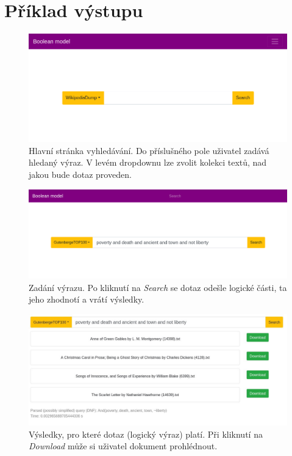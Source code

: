 \documentclass[a4paper,titlepage]{article}
\begin{document}
\section*{Příklad výstupu}

\begin{figure}[h]
\includegraphics[scale=0.4]{Frontend_search_page.png}
\caption{Hlavní stránka vyhledávání. Do příslušného pole uživatel zadává hledaný výraz.
V levém dropdownu lze zvolit kolekci textů, nad jakou bude dotaz proveden.
}
\end{figure}

\begin{figure}[h]
\includegraphics[scale=0.35]{Frontend_search_page_with_query.png}
\caption{Zadání výrazu. Po kliknutí na \emph{Search} se dotaz odešle
logické části, ta jeho zhodnotí a vrátí výsledky.}
\end{figure}

\begin{figure}[h]
\includegraphics[scale=0.35]{Frontend_query_results.jpg}
\caption{Výsledky, pro které dotaz (logický výraz) platí.
Při kliknutí na \emph{Download} může si uživatel dokument prohlédnout.}
\end{figure}
\end{document}
